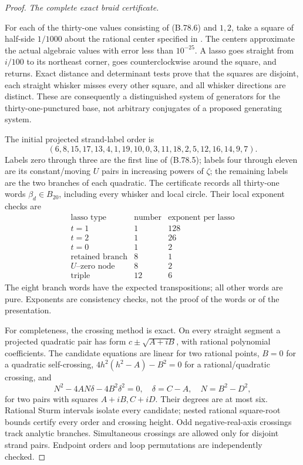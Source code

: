 \begin{proof}
\emph{The complete exact braid certificate.}\par
For each of the thirty-one values consisting of (B.78.6) and \(1,2\),
take a square of half-side \(1/1000\) about the rational center specified
in .
The centers approximate the actual algebraic values with error less
than \(10^{-25}\). A lasso goes straight from \(i/100\) to its northeast
corner, goes counterclockwise around the square, and returns. Exact
distance and determinant tests prove that the squares are disjoint,
each straight whisker misses every other square, and all whisker
directions are distinct. These are consequently a distinguished system
of generators for the thirty-one-punctured base, not arbitrary
conjugates of a proposed generating system.

The initial projected strand-label order is
\[
 (6,8,15,17,13,4,1,19,10,0,3,11,18,2,5,12,16,14,9,7).
 \tag{B.78.11}
\]
Labels zero through three are the first line of (B.78.5); labels four
through eleven are its constant/moving \(U\) pairs in increasing powers
of \(\zeta\); the remaining labels are the two branches of each
quadratic. The certificate records all thirty-one words
\(\beta_d\in B_{20}\), including every whisker and local circle.
Their local exponent checks are
\[
\begin{array}{c|r|r}
\text{lasso type}&\text{number}&\text{exponent per lasso}\\\hline
t=1&1&128\\
t=2&1&26\\
t=0&1&2\\
\text{retained branch}&8&1\\
U\text{--zero node}&8&2\\
\text{triple}&12&6
\end{array}
 \tag{B.78.12}
\]
The eight branch words have the expected transpositions; all other
words are pure. Exponents are consistency checks, not the proof of
the words or of the presentation.

For completeness, the crossing method is exact. On every straight
segment a projected quadratic pair has form \(c\pm\sqrt{A+iB}\),
with rational polynomial coefficients. The candidate equations are
linear for two rational points, \(B=0\) for a quadratic self-crossing,
\(4h^2(h^2-A)-B^2=0\) for a rational/quadratic crossing, and
\[
 N^2-4AN\delta-4B^2\delta^2=0,
 \quad \delta=C-A,\quad N=B^2-D^2,
 \tag{B.78.13}
\]
for two pairs with squares \(A+iB,C+iD\). Their degrees are at most
six. Rational Sturm intervals isolate every candidate; nested rational
square-root bounds certify every order and crossing height. Odd
negative-real-axis crossings track analytic branches. Simultaneous
crossings are allowed only for disjoint strand pairs. Endpoint orders
and loop permutations are independently checked.


\end{proof}
